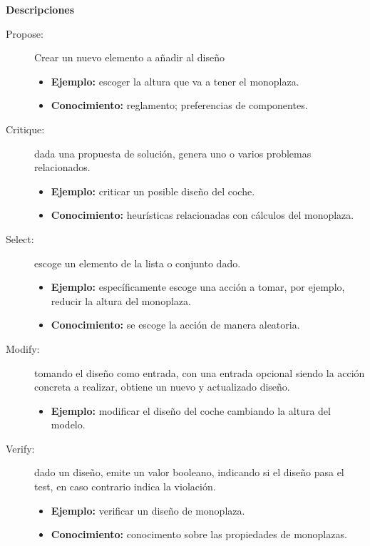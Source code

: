 \documentclass[12pt,a4paper,twoside,spanish]{article}      %
\begin{document}
\textbf{Descripciones}
\begin{description}
    \item [Propose:] Crear un nuevo elemento a añadir al diseño
        \hspace*{2cm}
        \begin{itemize}
            \item \textbf {Ejemplo:} escoger la altura que va a tener el monoplaza.
            \item \textbf {Conocimiento:} reglamento; preferencias de componentes.
        \end{itemize}
    \item [Critique:] dada una propuesta de solución, genera uno o varios problemas relacionados.
       \begin{itemize}
            \item \textbf {Ejemplo:} criticar un posible diseño del coche.
            \item \textbf {Conocimiento:} heurísticas relacionadas con cálculos del monoplaza.
        \end{itemize}
    \item [Select:] escoge un elemento de la lista o conjunto dado.
        \begin{itemize}
            \item \textbf {Ejemplo:} específicamente escoge una acción a tomar, por ejemplo, reducir la altura del monoplaza.
            \item \textbf {Conocimiento:} se escoge la acción de manera aleatoria.
        \end{itemize}
    \item [Modify:] tomando el diseño como entrada, con una entrada opcional siendo la acción concreta a realizar, obtiene un nuevo y actualizado diseño.
        \begin{itemize}
            \item \textbf {Ejemplo:} modificar el diseño del coche cambiando la altura del modelo.
        \end{itemize}
    \item [Verify:] dado un diseño, emite un valor booleano, indicando si el diseño pasa el test, en caso contrario indica la violación.
        \begin{itemize}
            \item \textbf {Ejemplo:} verificar un diseño de monoplaza.
            \item \textbf {Conocimiento:} conocimento sobre las propiedades de monoplazas.
        \end{itemize}
\end{description}
\end{document}
